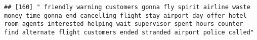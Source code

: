 \documentclass[
]{article}
\begin{document}
\begin{verbatim}
## [160] " friendly warning customers gonna fly spirit airline waste money time gonna end cancelling flight stay airport day offer hotel room agents interested helping wait supervisor spent hours counter find alternate flight customers ended stranded airport police called"                                                                                                                                                                                                                                                                                                                                                                                                                                                                                                                                                                                                                                                                                                                                                                                                                                                                                                                                                                                                                                                                                                                                                                                                                                                                                                                                                                                                                                                                                                                        

\end{verbatim}
\end{document}
